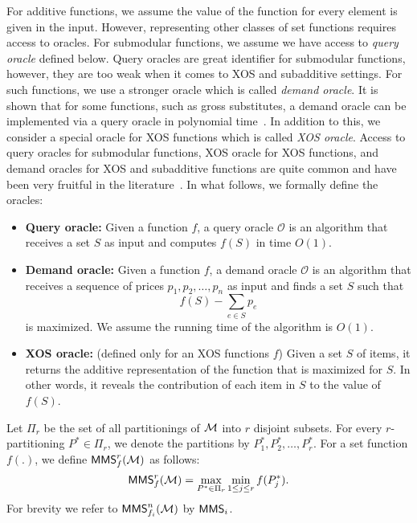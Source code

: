 For additive functions, we assume the value of the function for every element is given in the input. However, representing other classes of set functions requires access to oracles. For submodular functions, we assume we have access to \textit{query oracle} defined below. Query oracles are great identifier for submodular functions, however, they are too weak when it comes to XOS and subadditive settings. For such functions, we use a stronger oracle which is called \textit{demand oracle}. It is shown that for some functions, such as gross substitutes, a demand oracle can be implemented via a query oracle in polynomial time~\cite{leme2014gross}. In addition to this, we consider a special oracle for XOS functions which is called \textit{XOS oracle}. Access to query oracles for submodular functions, XOS oracle for XOS functions, and demand oracles for XOS and subadditive functions are quite common and have been very fruitful in the literature~\cite{dobzinski2005approximation,feige2009maximizing,feige2011maximizing,feige2006approximation,feldmancombinatorial,leme2014gross,vondrak2008optimal}. In what follows, we formally define the oracles:
\begin{itemize}
	\item \textbf{Query oracle:} Given a function $f$, a query oracle $\mathcal{O}$ is an algorithm that receives a set $S$ as input and computes $f(S)$ in time $O(1)$.
	\item \textbf{Demand oracle:} Given a function $f$, a demand oracle $\mathcal{O}$ is an algorithm that receives a sequence of prices $p_1, p_2, \ldots, p_n$ as input and finds a set $S$ such that
	$$f(S) - \sum_{e \in S} p_e$$ is maximized. We assume the running time of the algorithm is $O(1)$.  
	\item \textbf{XOS oracle:} (defined only for an XOS functions $f$) Given a set $S$ of items, it returns the additive representation of the function that is maximized for $S$. In other words, it reveals the contribution of each item in $S$ to the value of $f(S)$. 
\end{itemize}


Let $\Pi_r$ be the set of all partitionings of $\mathcal{M}$ into $r$ disjoint subsets. For every $r$-partitioning $P^* \in \Pi_r$, we denote the partitions by $P^*_1,P^*_2,\ldots,P^*_r$. For a set function $f(.)$, we define $\mathsf{MMS}_f^r(\mathcal{M})$ as follows:
$$ \mathsf{MMS}_f^r(\mathcal{M}) = \max_{P^* \in {\Pi_r}}  \min_{1 \leq j \leq r} f(P^*_j).$$
For brevity we refer to $\mathsf{MMS}_{f_i}^n(\mathcal{M})$ by $\mathsf{MMS}_{i}$.



